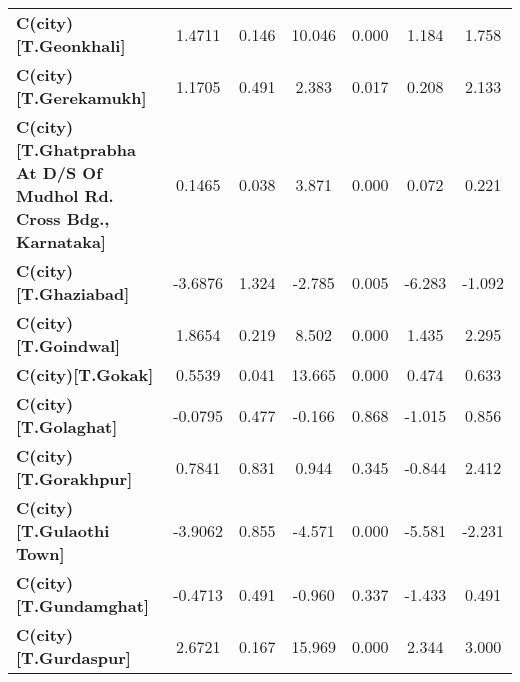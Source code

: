 \begin{center}
\begin{tabular}{lcccccc}
\textbf{C(city)[T.Geonkhali]}                                                                       &       1.4711  &        0.146     &    10.046  &         0.000        &        1.184    &        1.758     \\
\textbf{C(city)[T.Gerekamukh]}                                                                      &       1.1705  &        0.491     &     2.383  &         0.017        &        0.208    &        2.133     \\
\textbf{C(city)[T.Ghatprabha At D/S Of Mudhol Rd. Cross Bdg., Karnataka]}                           &       0.1465  &        0.038     &     3.871  &         0.000        &        0.072    &        0.221     \\
\textbf{C(city)[T.Ghaziabad]}                                                                       &      -3.6876  &        1.324     &    -2.785  &         0.005        &       -6.283    &       -1.092     \\
\textbf{C(city)[T.Goindwal]}                                                                        &       1.8654  &        0.219     &     8.502  &         0.000        &        1.435    &        2.295     \\
\textbf{C(city)[T.Gokak]}                                                                           &       0.5539  &        0.041     &    13.665  &         0.000        &        0.474    &        0.633     \\
\textbf{C(city)[T.Golaghat]}                                                                        &      -0.0795  &        0.477     &    -0.166  &         0.868        &       -1.015    &        0.856     \\
\textbf{C(city)[T.Gorakhpur]}                                                                       &       0.7841  &        0.831     &     0.944  &         0.345        &       -0.844    &        2.412     \\
\textbf{C(city)[T.Gulaothi Town]}                                                                   &      -3.9062  &        0.855     &    -4.571  &         0.000        &       -5.581    &       -2.231     \\
\textbf{C(city)[T.Gundamghat]}                                                                      &      -0.4713  &        0.491     &    -0.960  &         0.337        &       -1.433    &        0.491     \\
\textbf{C(city)[T.Gurdaspur]}                                                                       &       2.6721  &        0.167     &    15.969  &         0.000        &        2.344    &        3.000     \\

\end{tabular}
\end{center}
